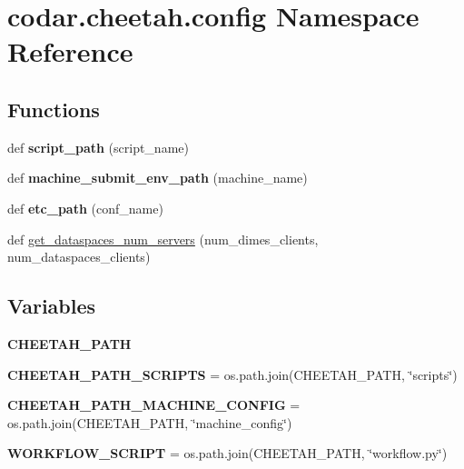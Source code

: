 \hypertarget{namespacecodar_1_1cheetah_1_1config}{}\section{codar.\+cheetah.\+config Namespace Reference}
\label{namespacecodar_1_1cheetah_1_1config}
\subsection*{Functions}
\begin{DoxyCompactItemize}
\item 
\mbox{\label{namespacecodar_1_1cheetah_1_1config_aaecac5db531a7ad2e0a6cb121a7ee640}} 
def {\bfseries script\+\_\+path} (script\+\_\+name)
\item 
\mbox{\label{namespacecodar_1_1cheetah_1_1config_a906f4dbe8936921e615b9cc8eae8383f}} 
def {\bfseries machine\+\_\+submit\+\_\+env\+\_\+path} (machine\+\_\+name)
\item 
\mbox{\label{namespacecodar_1_1cheetah_1_1config_a1028977b1cc5dc7f54bd65cb46256c8d}} 
def {\bfseries etc\+\_\+path} (conf\+\_\+name)
\item 
def \hyperlink{namespacecodar_1_1cheetah_1_1config_a777b4339975017c9521b943afd76748d}{get\+\_\+dataspaces\+\_\+num\+\_\+servers} (num\+\_\+dimes\+\_\+clients, num\+\_\+dataspaces\+\_\+clients)
\end{DoxyCompactItemize}
\subsection*{Variables}
\begin{DoxyCompactItemize}
\item 
{\bfseries C\+H\+E\+E\+T\+A\+H\+\_\+\+P\+A\+TH}
\item 
\mbox{\label{namespacecodar_1_1cheetah_1_1config_a326d76d724a30795d5e2b25c59a1454a}} 
{\bfseries C\+H\+E\+E\+T\+A\+H\+\_\+\+P\+A\+T\+H\+\_\+\+S\+C\+R\+I\+P\+TS} = os.\+path.\+join(C\+H\+E\+E\+T\+A\+H\+\_\+\+P\+A\+TH, \char`\"{}scripts\char`\"{})
\item 
\mbox{\label{namespacecodar_1_1cheetah_1_1config_a5d735d6f2f43c555f2e137b38af7fc94}} 
{\bfseries C\+H\+E\+E\+T\+A\+H\+\_\+\+P\+A\+T\+H\+\_\+\+M\+A\+C\+H\+I\+N\+E\+\_\+\+C\+O\+N\+F\+IG} = os.\+path.\+join(C\+H\+E\+E\+T\+A\+H\+\_\+\+P\+A\+TH, \char`\"{}machine\+\_\+config\char`\"{})
\item 
\mbox{\label{namespacecodar_1_1cheetah_1_1config_a069e6b421b6b35917575637b5fe64409}} 
{\bfseries W\+O\+R\+K\+F\+L\+O\+W\+\_\+\+S\+C\+R\+I\+PT} = os.\+path.\+join(C\+H\+E\+E\+T\+A\+H\+\_\+\+P\+A\+TH, \char`\"{}workflow.\+py\char`\"{})
\end{DoxyCompactItemize}


